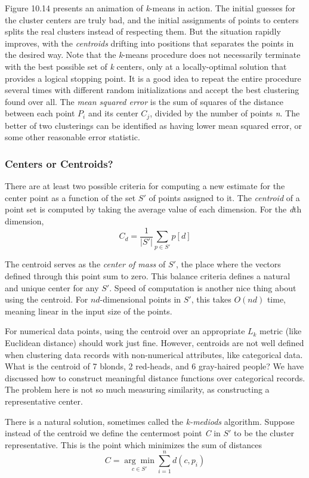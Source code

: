 \documentclass[10pt]{article}
\begin{document}
Figure 10.14 presents an animation of \textit{k}-means in action. The initial guesses for the cluster centers are truly bad, and the initial assignments of points to centers splits the real clusters instead of respecting them. But the situation rapidly improves, with the \textit{centroids} drifting into positions that separates the points in the desired way. Note that the \textit{k}-means procedure does not necessarily terminate with the best possible set of \textit{k} centers, only at a locally-optimal solution that provides a logical stopping point. It is a good idea to repeat the entire procedure several times with different random initializations and accept the best clustering found over all. The \textit{mean squared error} is the sum of squares of the distance between each point \(P_i\) and its center \(C_j\), divided by the number of points \textit{n}. The better of two clusterings can be identified as having lower mean squared error, or some other reasonable error statistic.

\subsubsection{Centers or Centroids?}
There are at least two possible criteria for computing a new estimate for the center point as a function of the set \(S'\) of points assigned to it. The \textit{centroid} of a point set is computed by taking the average value of each dimension. For the \textit{d}th dimension,
\[
C_d=\frac{1}{|S'|}\sum_{p \in S'} p[d]
\]

The centroid serves as the \textit{center of mass} of \(S'\), the place where the vectors defined through this point sum to zero. This balance criteria defines a natural and unique center for any \(S'\). Speed of computation is another nice thing about using the centroid. For \(nd\)-dimensional points in \(S'\), this takes \(O(nd)\) time, meaning linear in the input size of the points.

For numerical data points, using the centroid over an appropriate \(L_k\) metric (like Euclidean distance) should work just fine. However, centroids are not well defined when clustering data records with non-numerical attributes, like categorical data. What is the centroid of 7 blonds, 2 red-heads, and 6 gray-haired people? We have discussed how to construct meaningful distance functions over categorical records. The problem here is not so much measuring similarity, as constructing a representative center.

There is a natural solution, sometimes called the \textit{k-mediods} algorithm. Suppose instead of the centroid we define the centermost point \textit{C} in \(S'\) to be the cluster representative. This is the point which minimizes the sum of distances
\[
C=\underset{c \in S'}{\arg \min} \sum_{i=1}^{n} d(c, p_i)
\]
\end{document}
